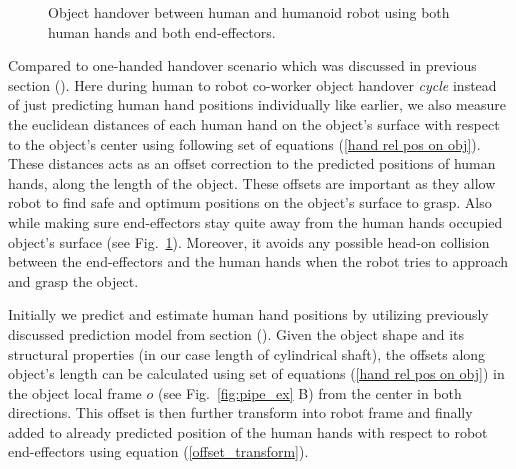 \begin{figure}[hptb]
	\caption{Object handover between human and humanoid robot using both human hands and both end-effectors.}
	\label{fig:h-r-pipe-handover}
\end{figure}

Compared to one-handed handover scenario which was discussed in previous section (). Here during human to robot co-worker object handover \textit{cycle} instead of just predicting human hand positions individually like earlier, we also measure the euclidean distances of each human hand on the object's surface with respect to the object's center using following set of equations (\ref{hand rel pos on obj}). These distances acts as an offset correction to the predicted positions of human hands, along the length of the object. These offsets are important as they allow robot to find safe and optimum positions on the object's surface to grasp. Also while making sure end-effectors stay quite away from the human hands occupied object's surface (see Fig.~\ref{fig:h-r-pipe-handover}). Moreover, it avoids any possible head-on collision between the end-effectors and the human hands when the robot tries to approach and grasp the object.


Initially we predict and estimate human hand positions by utilizing previously discussed prediction model from section (). Given the object shape and its structural properties (in our case length of cylindrical shaft), the offsets along object's length can be calculated using set of equations (\ref{hand rel pos on obj}) in the object local frame $o$ (see Fig.~\ref{fig:pipe_ex} B) from the center in both directions. This offset is then further transform into robot frame and finally added to already predicted position of the human hands with respect to robot end-effectors using equation (\ref{offset_transform}).

